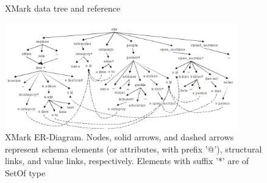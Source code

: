 \begin{figure}
	\centering
	\centering
	\caption{XMark data tree and reference}
	\label{fig:xmark-tree-reference}
\end{figure}
\begin{figure}
	\centering
	\includegraphics[width=0.90\textwidth]{img/xmark-schema-4}
	\caption{XMark ER-Diagram. Nodes, solid arrows, and dashed arrows represent schema elements (or attributes, with prefix '@'), structural links, and value links, respectively. Elements with suffix '*' are of SetOf type\cite{xmark/schema-sumerize}}
	\label{fig:xmark-schema}
\end{figure}



